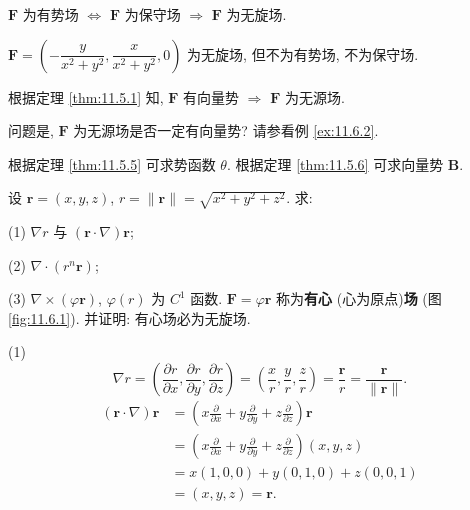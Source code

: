$\boldsymbol{F}$ 为有势场 $\Longleftrightarrow$ $\boldsymbol{F}$ 为保守场 $\Rightarrow$ $\boldsymbol{F}$ 为无旋场.

$\boldsymbol{F}=\left(-\dfrac{y}{x^{2}+y^{2}},\dfrac{x}{x^{2}+y^{2}},0\right)$ 为无旋场, 但不为有势场, 不为保守场.

根据定理 \ref{thm:11.5.1} 知, $\boldsymbol{F}$ 有向量势 $\Rightarrow$ $\boldsymbol{F}$ 为无源场.

问题是, $\boldsymbol{F}$ 为无源场是否一定有向量势? 请参看例 \ref{ex:11.6.2}.

根据定理 \ref{thm:11.5.5} 可求势函数 $\theta$. 根据定理 \ref{thm:11.5.6} 可求向量势 $\boldsymbol{B}$.

\begin{example}\label{ex:11.6.1}
设 $\boldsymbol{r}=(x,y,z)$, $r=\|\boldsymbol{r}\|=\sqrt{x^{2}+y^{2}+z^{2}}$. 求:

(1) $\nabla r$ 与 $(\boldsymbol{r}\cdot\nabla)\boldsymbol{r}$;

(2) $\nabla\cdot(r^{n}\boldsymbol{r})$;

(3) $\nabla\times(\varphi\boldsymbol{r})$, $\varphi(r)$ 为 $C^{1}$ 函数. $\boldsymbol{F}=\varphi\boldsymbol{r}$ 称为\textbf{有心} (心为原点)\textbf{场} (图 \ref{fig:11.6.1}). 并证明: 有心场必为无旋场.
\end{example}

\begin{solution}
(1)
\[
\nabla r=\left(\frac{\partial r}{\partial x},\frac{\partial r}{\partial y},\frac{\partial r}{\partial z}\right)=\left(\frac{x}{r},\frac{y}{r},\frac{z}{r}\right)=\frac{\boldsymbol{r}}{r}=\frac{\boldsymbol{r}}{\|\boldsymbol{r}\|}.
\]
\[
\begin{aligned}
(\boldsymbol{r}\cdot\nabla)\boldsymbol{r}&=\left(x\frac{\partial}{\partial x}+y\frac{\partial}{\partial y}+z\frac{\partial}{\partial z}\right)\boldsymbol{r}\\
&=\left(x\frac{\partial}{\partial x}+y\frac{\partial}{\partial y}+z\frac{\partial}{\partial z}\right)(x,y,z)\\
&=x(1,0,0)+y(0,1,0)+z(0,0,1)\\
&=(x,y,z)=\boldsymbol{r}.
\end{aligned}
\]
\end{solution}

